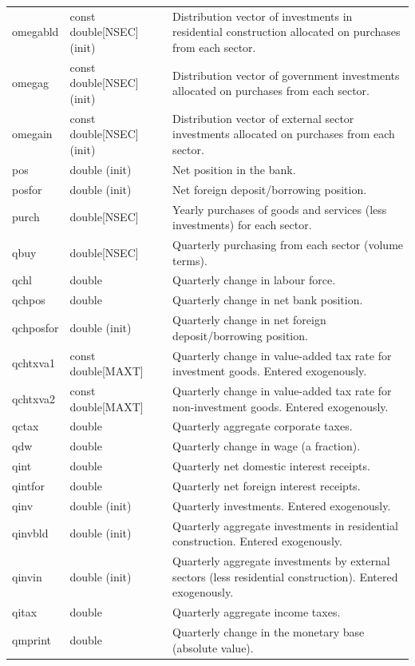 \documentclass{article}
\begin{document}
\begin{longtable}{p{}p{}p{}}
omegabld & const double[NSEC] (init) & Distribution vector of investments in residential construction allocated on purchases from each sector.\\
omegag & const double[NSEC] (init) & Distribution vector of government investments allocated on purchases from each sector.\\
omegain & const double[NSEC] (init) & Distribution vector of external sector investments allocated on purchases from each sector.\\
pos & double (init) & Net position in the bank.\\
posfor & double (init) & Net foreign deposit/borrowing position.\\
purch & double[NSEC] & Yearly purchases of goods and services (less investments) for each sector.\\
qbuy & double[NSEC] & Quarterly purchasing from each sector (volume terms).\\
qchl & double & Quarterly change in labour force.\\
qchpos & double & Quarterly change in net bank position.\\
qchposfor & double (init) & Quarterly change in net foreign deposit/borrowing position.\\
qchtxva1 & const double[MAXT] & Quarterly change in value-added tax rate for investment goods. Entered exogenously.\\
qchtxva2 & const double[MAXT] & Quarterly change in value-added tax rate for non-investment goods. Entered exogenously.\\
qctax & double & Quarterly aggregate corporate taxes.\\
qdw & double & Quarterly change in wage (a fraction).\\
qint & double & Quarterly net domestic interest receipts.\\
qintfor & double & Quarterly net foreign interest receipts.\\
qinv & double (init) & Quarterly investments. Entered exogenously.\\
qinvbld & double (init) & Quarterly aggregate investments in residential construction. Entered exogenously.\\
qinvin & double (init) & Quarterly aggregate investments by external sectors (less residential construction). Entered exogenously.\\
qitax & double & Quarterly aggregate income taxes.\\
qmprint & double & Quarterly change in the monetary base (absolute value).\\

\end{longtable}
\end{document}
